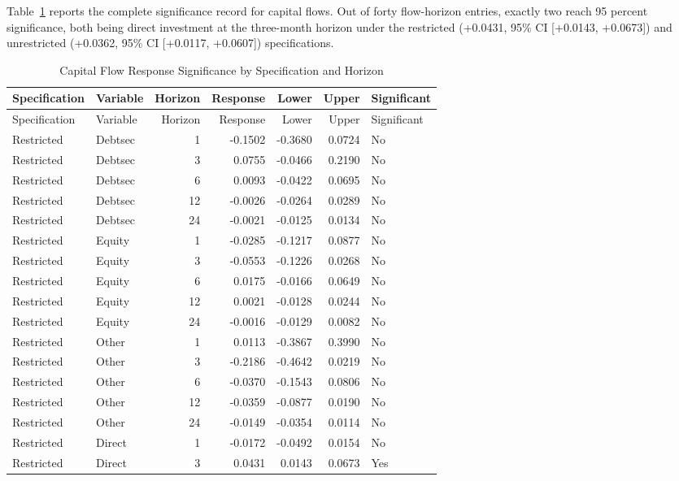 Table~\ref{tab:flowsig} reports the complete significance record for capital flows. Out of forty flow-horizon entries, exactly two reach 95 percent significance, both being direct investment at the three-month horizon under the restricted (+0.0431, 95\% CI [+0.0143, +0.0673]) and unrestricted (+0.0362, 95\% CI [+0.0117, +0.0607]) specifications.

\begin{longtable}{@{}l l r r r r l@{}}
  \caption{Capital Flow Response Significance by Specification and Horizon} \label{tab:flowsig} \\
  \toprule
  Specification & Variable & Horizon & Response & Lower & Upper & Significant \\
  \midrule
  \endfirsthead
  \toprule
  Specification & Variable & Horizon & Response & Lower & Upper & Significant \\
  \midrule
  \endhead
  \bottomrule
  \endlastfoot
  \small
Restricted & Debtsec & 1 & -0.1502 & -0.3680 & 0.0724 & No \\
Restricted & Debtsec & 3 & 0.0755 & -0.0466 & 0.2190 & No \\
Restricted & Debtsec & 6 & 0.0093 & -0.0422 & 0.0695 & No \\
Restricted & Debtsec & 12 & -0.0026 & -0.0264 & 0.0289 & No \\
Restricted & Debtsec & 24 & -0.0021 & -0.0125 & 0.0134 & No \\
Restricted & Equity & 1 & -0.0285 & -0.1217 & 0.0877 & No \\
Restricted & Equity & 3 & -0.0553 & -0.1226 & 0.0268 & No \\
Restricted & Equity & 6 & 0.0175 & -0.0166 & 0.0649 & No \\
Restricted & Equity & 12 & 0.0021 & -0.0128 & 0.0244 & No \\
Restricted & Equity & 24 & -0.0016 & -0.0129 & 0.0082 & No \\
Restricted & Other & 1 & 0.0113 & -0.3867 & 0.3990 & No \\
Restricted & Other & 3 & -0.2186 & -0.4642 & 0.0219 & No \\
Restricted & Other & 6 & -0.0370 & -0.1543 & 0.0806 & No \\
Restricted & Other & 12 & -0.0359 & -0.0877 & 0.0190 & No \\
Restricted & Other & 24 & -0.0149 & -0.0354 & 0.0114 & No \\
Restricted & Direct & 1 & -0.0172 & -0.0492 & 0.0154 & No \\
Restricted & Direct & 3 & 0.0431 & 0.0143 & 0.0673 & Yes \\

\end{longtable}
